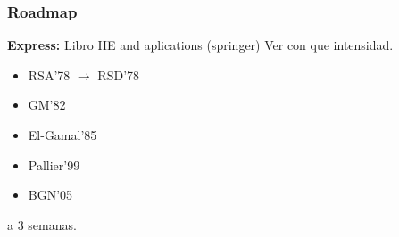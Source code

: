 \documentclass[10pt]{beamer}
\begin{document}
\begin{frame}
\frametitle{Roadmap}


    \textbf{Express:} Libro HE and aplications (springer)
  \vspace{0.3cm}
  Ver con que intensidad.

 \begin{itemize}
    \item RSA'78 $\rightarrow$ RSD'78
    \item GM'82
    \item El-Gamal'85
    \item Pallier'99
    \item BGN'05
  \end{itemize}
  \vspace{0.3cm}

 a 3 semanas.


\end{frame}

\end{document}
